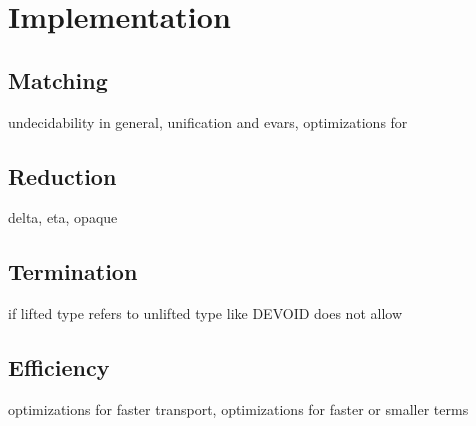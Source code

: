 \section{Implementation}
\label{sec:implementation}


\subsection{Matching}

undecidability in general, unification and evars, optimizations for 

\subsection{Reduction}

delta, eta, opaque

\subsection{Termination}

if lifted type refers to unlifted type like DEVOID does not allow

\subsection{Efficiency}

optimizations for faster transport, optimizations for faster or smaller terms
